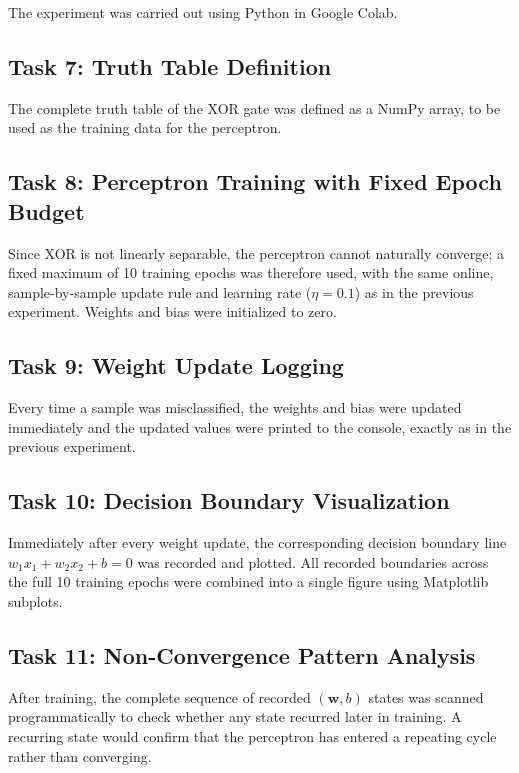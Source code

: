 \documentclass[11pt,a4paper]{article}
\begin{document}



The experiment was carried out using Python in Google Colab.


\subsection*{Task 7: Truth Table Definition}

The complete truth table of the XOR gate was defined as a NumPy array, to be used as the training data for the perceptron.


\subsection*{Task 8: Perceptron Training with Fixed Epoch Budget}

Since XOR is not linearly separable, the perceptron cannot naturally converge; a fixed maximum of 10 training epochs was therefore used, with the same online, sample-by-sample update rule and learning rate ($\eta = 0.1$) as in the previous experiment. Weights and bias were initialized to zero.


\subsection*{Task 9: Weight Update Logging}

Every time a sample was misclassified, the weights and bias were updated immediately and the updated values were printed to the console, exactly as in the previous experiment.


\subsection*{Task 10: Decision Boundary Visualization}

Immediately after every weight update, the corresponding decision boundary line $w_1x_1+w_2x_2+b=0$ was recorded and plotted. All recorded boundaries across the full 10 training epochs were combined into a single figure using Matplotlib subplots.


\subsection*{Task 11: Non-Convergence Pattern Analysis}

After training, the complete sequence of recorded $(\mathbf{w},b)$ states was scanned programmatically to check whether any state recurred later in training. A recurring state would confirm that the perceptron has entered a repeating cycle rather than converging.
\end{document}
